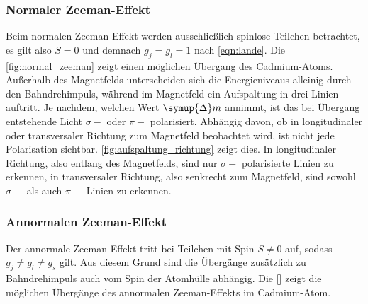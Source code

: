 \subsubsection{Normaler Zeeman-Effekt}

    Beim normalen Zeeman-Effekt werden ausschließlich spinlose Teilchen betrachtet,
    es gilt also $S = 0$ und demnach $g_j = g_l = 1$ nach \autoref{eqn:lande}.
    Die \autoref{fig:normal_zeeman} zeigt einen möglichen Übergang des Cadmium-Atoms.
    Außerhalb des Magnetfelds unterscheiden sich die Energieniveaus alleinig durch den Bahndrehimpuls,
    während im Magnetfeld ein Aufspaltung in drei Linien auftritt.
    Je nachdem, 
    welchen Wert $\symup{\Delta} m$ annimmt, 
    ist das bei Übergang entstehende Licht $\sigma-$ oder $\pi-$ polarisiert.
    Abhängig davon,
    ob in longitudinaler oder transversaler Richtung zum Magnetfeld beobachtet wird,
    ist nicht jede Polarisation sichtbar.
    \autoref{fig:aufspaltung_richtung} zeigt dies.
    In longitudinaler Richtung,
    also entlang des Magnetfelds,
    sind nur $\sigma-$ polarisierte Linien zu erkennen,
    in transversaler Richtung,
    also senkrecht zum Magnetfeld,
    sind sowohl $\sigma-$ als auch $\pi-$ Linien zu erkennen.

\subsubsection{Annormalen Zeeman-Effekt}

    Der annormale Zeeman-Effekt tritt bei Teilchen mit Spin $S \neq 0$ auf,
    sodass $g_j \neq g_l \neq g_s$ gilt.
    Aus diesem Grund sind die Übergänge zusätzlich zu Bahndrehimpuls auch vom Spin der Atomhülle abhängig.
    Die \autoref{} zeigt die möglichen Übergänge des annormalen Zeeman-Effekts im Cadmium-Atom.

